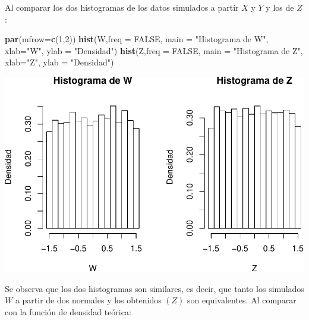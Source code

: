 \documentclass[]{article}
\newenvironment{Shaded}{\begin{snugshade}}{\end{snugshade}}
\newcommand{\KeywordTok}[1]{\textcolor[rgb]{0.13,0.29,0.53}{\textbf{#1}}}
\newcommand{\DataTypeTok}[1]{\textcolor[rgb]{0.13,0.29,0.53}{#1}}
\newcommand{\DecValTok}[1]{\textcolor[rgb]{0.00,0.00,0.81}{#1}}
\newcommand{\StringTok}[1]{\textcolor[rgb]{0.31,0.60,0.02}{#1}}
\newcommand{\OtherTok}[1]{\textcolor[rgb]{0.56,0.35,0.01}{#1}}
\newcommand{\NormalTok}[1]{#1}
\begin{document}
Al comparar los dos histogramas de los datos simulados a partir \(X\) y
\(Y\) y los de \(Z\):

\begin{Shaded}
\begin{Highlighting}[]
\KeywordTok{par}\NormalTok{(}\DataTypeTok{mfrow=}\KeywordTok{c}\NormalTok{(}\DecValTok{1}\NormalTok{,}\DecValTok{2}\NormalTok{))}
\KeywordTok{hist}\NormalTok{(W,}\DataTypeTok{freq =} \OtherTok{FALSE}\NormalTok{, }\DataTypeTok{main =} \StringTok{"Histograma de W"}\NormalTok{, }\DataTypeTok{xlab=}\StringTok{"W"}\NormalTok{, }\DataTypeTok{ylab =} \StringTok{"Densidad"}\NormalTok{)}
\KeywordTok{hist}\NormalTok{(Z,}\DataTypeTok{freq =} \OtherTok{FALSE}\NormalTok{, }\DataTypeTok{main =} \StringTok{"Histograma de Z"}\NormalTok{, }\DataTypeTok{xlab=}\StringTok{"Z"}\NormalTok{, }\DataTypeTok{ylab =} \StringTok{"Densidad"}\NormalTok{)}
\end{Highlighting}
\end{Shaded}

\includegraphics[width=0.75\linewidth]{notebook_simulaciones_files/figure-latex/unnamed-chunk-8-1}

Se observa que los dos histogramas son similares, es decir, que tanto
los simulados \(W\) a partir de dos normales y los obtenidos \((Z)\) son
equivalentes. Al comparar con la función de densidad teórica:
\end{document}
